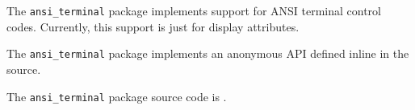
The {\tt ansi\_terminal} package implements support for ANSI terminal control codes.  Currently, this support 
is just for display attributes.

The {\tt ansi\_terminal} package implements an anonymous API defined inline in the source.

The {\tt ansi\_terminal} package source code is .



